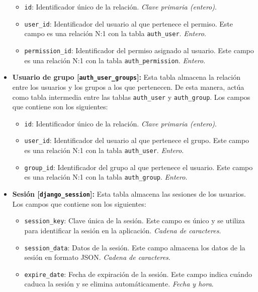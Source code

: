 \begin{itemize}
\begin{itemize}
              \item \texttt{id}: Identificador único de la relación. \textit{Clave primaria (entero)}.
              \item \texttt{user\_id}: Identificador del usuario al que pertenece el permiso. Este campo es una relación N:1 con la tabla \texttt{auth\_user}. \textit{Entero}.
              \item \texttt{permission\_id}: Identificador del permiso asignado al usuario. Este campo es una relación N:1 con la tabla \texttt{auth\_permission}. \textit{Entero}.
          \end{itemize}
    \item \textbf{Usuario de grupo [\texttt{auth\_user\_groups}]:} Esta tabla almacena la relación entre los usuarios y los grupos a los que pertenecen. De esta manera, actúa como tabla intermedia entre las tablas \texttt{auth\_user} y \texttt{auth\_group}. Los campos que contiene son los siguientes:
          \begin{itemize}
              \item \texttt{id}: Identificador único de la relación. \textit{Clave primaria (entero)}.
              \item \texttt{user\_id}: Identificador del usuario al que pertenece el grupo. Este campo es una relación N:1 con la tabla \texttt{auth\_user}. \textit{Entero}.
              \item \texttt{group\_id}: Identificador del grupo al que pertenece el usuario. Este campo es una relación N:1 con la tabla \texttt{auth\_group}. \textit{Entero}.
          \end{itemize}
    \item \textbf{Sesión [\texttt{django\_session}]:} Esta tabla almacena las sesiones de los usuarios. Los campos que contiene son los siguientes:
          \begin{itemize}
              \item \texttt{session\_key}: Clave única de la sesión. Este campo es único y se utiliza para identificar la sesión en la aplicación. \textit{Cadena de caracteres}.
              \item \texttt{session\_data}: Datos de la sesión. Este campo almacena los datos de la sesión en formato JSON. \textit{Cadena de caracteres}.
              \item \texttt{expire\_date}: Fecha de expiración de la sesión. Este campo indica cuándo caduca la sesión y se elimina automáticamente. \textit{Fecha y hora}.
          \end{itemize}
\end{itemize}

